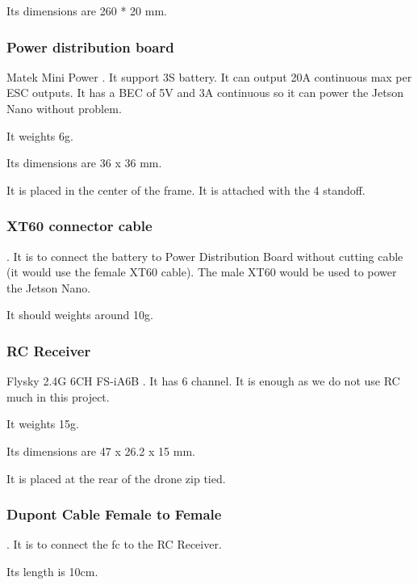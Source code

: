 Its dimensions are 260 * 20 mm.

\subsubsection{Power distribution board}
Matek Mini Power \cite{bangood_pdb}. It support 3S battery. It can output 20A continuous max per ESC outputs. It has a BEC of 5V and 3A continuous so it can power the Jetson Nano without problem.

It weights 6g.

Its dimensions are 36 x 36 mm.

It is placed in the center of the frame. It is attached with the 4 standoff.

\subsubsection{XT60 connector cable}
\cite{bangood_xt60_cable}. It is to connect the battery to Power Distribution Board without cutting cable (it would use the female XT60 cable). The male XT60 would be used to power the Jetson Nano.

It should weights around 10g.

\subsubsection{RC Receiver}
Flysky 2.4G 6CH FS-iA6B \cite{bangood_receiver}. It has 6 channel. It is enough as we do not use RC much in this project.

It weights 15g.

Its dimensions are 47 x 26.2 x 15 mm.

It is placed at the rear of the drone zip tied.

\subsubsection{Dupont Cable Female to Female}
\cite{bangood_dupont_cable}. It is to connect the \gls{fc} to the RC Receiver.

Its length is 10cm.

